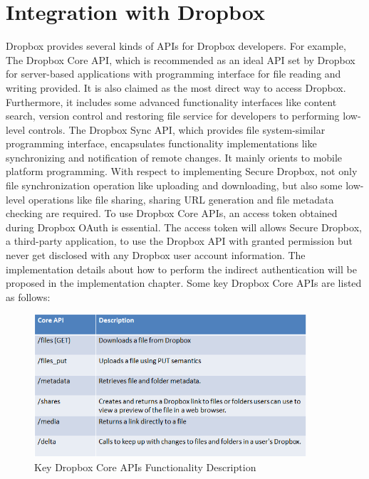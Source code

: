 \section {Integration with Dropbox}

Dropbox provides several kinds of APIs for Dropbox developers. For example, The Dropbox Core API, which is recommended as an ideal API set by Dropbox for server-based applications with programming interface for file reading and writing provided. It is also claimed as the most direct way to access Dropbox. Furthermore, it includes some advanced functionality interfaces like content search, version control and restoring file service for developers to performing low-level controls. The Dropbox Sync API, which provides file system-similar programming interface, encapsulates functionality implementations like synchronizing and notification of remote changes. It mainly orients to mobile platform programming. With respect to implementing Secure Dropbox, not only file synchronization operation like uploading and downloading, but also some low-level operations like file sharing, sharing URL generation and file metadata checking are required. To use Dropbox Core APIs, an access token obtained during Dropbox OAuth is essential. The access token will allows Secure Dropbox, a third-party application, to use the Dropbox API with granted permission but never get disclosed with any Dropbox user account information. The implementation details about how to perform the indirect authentication will be proposed in the implementation chapter. Some key Dropbox Core APIs are listed as follows:

\begin{figure}[h]
        \centering
        \includegraphics[width=0.9\textwidth]{figures/Key_Dropbox_Core_APIs_Functionality_Description.png}
        \caption[Dropbox Core API] {Key Dropbox Core APIs Functionality Description}
\end{figure}

